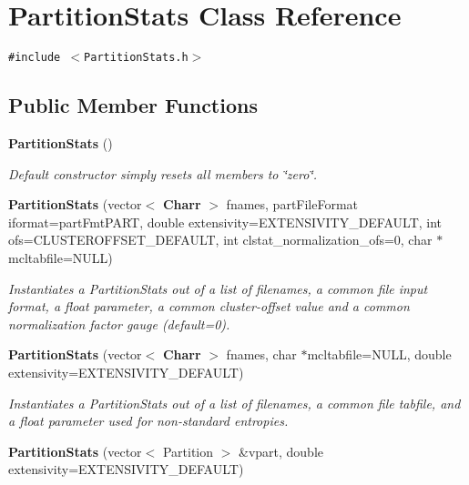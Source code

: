\section{Partition\-Stats Class Reference}
\label{classPartitionStats}
{\tt \#include $<$Partition\-Stats.h$>$}

\subsection*{Public Member Functions}
\begin{CompactItemize}
\item 
{\bf Partition\-Stats} ()\label{classPartitionStats_a0}

\begin{CompactList}\small\item\em Default constructor simply resets all members to \char`\"{}zero\char`\"{}. \item\end{CompactList}\item 
{\bf Partition\-Stats} (vector$<$ {\bf Charr} $>$ fnames, part\-File\-Format iformat=part\-Fmt\-PART, double extensivity=EXTENSIVITY\_\-DEFAULT, int ofs=CLUSTEROFFSET\_\-DEFAULT, int clstat\_\-normalization\_\-ofs=0, char $\ast$mcltabfile=NULL)\label{classPartitionStats_a1}

\begin{CompactList}\small\item\em Instantiates a Partition\-Stats out of a list of filenames, a common file input format, a float parameter, a common cluster-offset value and a common normalization factor gauge (default=0). \item\end{CompactList}\item 
{\bf Partition\-Stats} (vector$<$ {\bf Charr} $>$ fnames, char $\ast$mcltabfile=NULL, double extensivity=EXTENSIVITY\_\-DEFAULT)\label{classPartitionStats_a2}

\begin{CompactList}\small\item\em Instantiates a Partition\-Stats out of a list of filenames, a common file tabfile, and a float parameter used for non-standard entropies. \item\end{CompactList}\item 
{\bf Partition\-Stats} (vector$<$ Partition $>$ \&vpart, double extensivity=EXTENSIVITY\_\-DEFAULT)\label{classPartitionStats_a3}


\end{CompactItemize}
